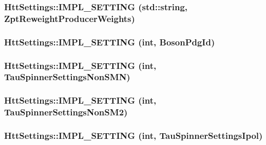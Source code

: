 \label{classHttSettings_ab215ffcb567aceff98b8289457827490}
\hypertarget{classHttSettings_ad109f6b7e230f5ce774887febfb7e248}{
\subsubsection[{IMPL\_\-SETTING}]{\setlength{\rightskip}{0pt plus 5cm}HttSettings::IMPL\_\-SETTING (std::string, \/  ZptReweightProducerWeights)}}
\label{classHttSettings_ad109f6b7e230f5ce774887febfb7e248}
\hypertarget{classHttSettings_a6fd5d204a586a0fbbbb89f3f940ee017}{
\subsubsection[{IMPL\_\-SETTING}]{\setlength{\rightskip}{0pt plus 5cm}HttSettings::IMPL\_\-SETTING (int, \/  BosonPdgId)}}
\label{classHttSettings_a6fd5d204a586a0fbbbb89f3f940ee017}
\hypertarget{classHttSettings_a84f818de8883e7a52e5ca6d4ac3e2de2}{
\subsubsection[{IMPL\_\-SETTING}]{\setlength{\rightskip}{0pt plus 5cm}HttSettings::IMPL\_\-SETTING (int, \/  TauSpinnerSettingsNonSMN)}}
\label{classHttSettings_a84f818de8883e7a52e5ca6d4ac3e2de2}
\hypertarget{classHttSettings_a675074223c4ad2c8654c73fe71c32ebb}{
\subsubsection[{IMPL\_\-SETTING}]{\setlength{\rightskip}{0pt plus 5cm}HttSettings::IMPL\_\-SETTING (int, \/  TauSpinnerSettingsNonSM2)}}
\label{classHttSettings_a675074223c4ad2c8654c73fe71c32ebb}
\hypertarget{classHttSettings_a962c50a239f57a36583e58c16df03009}{
\subsubsection[{IMPL\_\-SETTING}]{\setlength{\rightskip}{0pt plus 5cm}HttSettings::IMPL\_\-SETTING (int, \/  TauSpinnerSettingsIpol)}}
